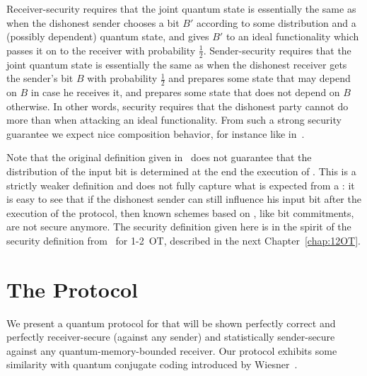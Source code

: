 Receiver-security requires that the joint quantum state is essentially
the same as when the dishonest sender chooses a bit $B'$ according to
some distribution and a (possibly dependent) quantum state, and gives
$B'$ to an ideal functionality which passes it on to the receiver with
probability $\frac12$. Sender-security requires that the joint quantum
state is essentially the same as when the dishonest receiver gets the
sender's bit $B$ with probability $\frac12$ and prepares some state
that may depend on $B$ in case he receives it, and prepares some state
that does not depend on $B$ otherwise. In other words, security
requires that the dishonest party cannot do more than when attacking
an ideal functionality.  From such a strong security guarantee we
expect nice composition behavior, for instance like
in~\cite{CSSW06}.

Note that the original definition given in~\cite{DFSS05} does not
guarantee that the distribution of the input bit is determined at the
end the execution of \RabinOT. This is a strictly weaker definition
and does not fully capture what is expected from a \RabinOT: it is
easy to see that if the dishonest sender can still influence his input
bit after the execution of the protocol, then known schemes based on
\RabinOT, like bit commitments, are not secure anymore. The security
definition given here is in the spirit of the security definition
from~\cite{DFRSS07} for 1-2~OT, described in the next
Chapter~\ref{chap:12OT}.

\section{The Protocol}\label{sec:otprot}
We present a quantum protocol for \RabinOT that will be shown
perfectly correct and perfectly receiver-secure (against any sender)
and statistically sender-secure against any quantum-memory-bounded
receiver. Our protocol exhibits some similarity with quantum conjugate
coding introduced by Wiesner~\cite{Wiesner83}. 

